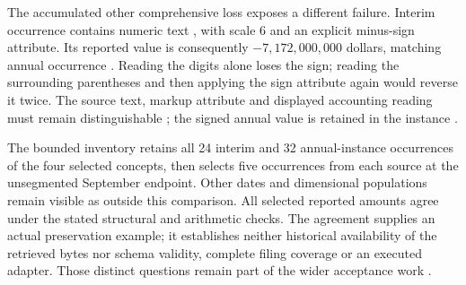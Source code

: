The accumulated other comprehensive loss exposes a different failure. Interim
occurrence  contains numeric text , with scale 6 and
an explicit minus-sign attribute. Its reported value is consequently
$-7{,}172{,}000{,}000$ dollars, matching annual occurrence . Reading
the digits alone loses the sign; reading the surrounding parentheses and then
applying the sign attribute again would reverse it twice. The source text,
markup attribute and displayed accounting reading must remain distinguishable
\citep[printed p.~3]{apple2025q1}; the signed annual value is retained in the instance \citep{apple2024xbrlinstance}.

The bounded inventory retains all 24 interim and 32 annual-instance occurrences
of the four selected concepts, then selects five occurrences from each source
at the unsegmented September endpoint. Other dates and dimensional populations
remain visible as outside this comparison. All selected reported amounts
agree under the stated structural and arithmetic checks. The agreement supplies
an actual preservation example; it establishes neither historical availability
of the retrieved bytes nor schema validity, complete filing coverage or an
executed adapter. Those distinct questions remain part of the wider acceptance
work \citep{apple2025q1,apple2024xbrlinstance}.
